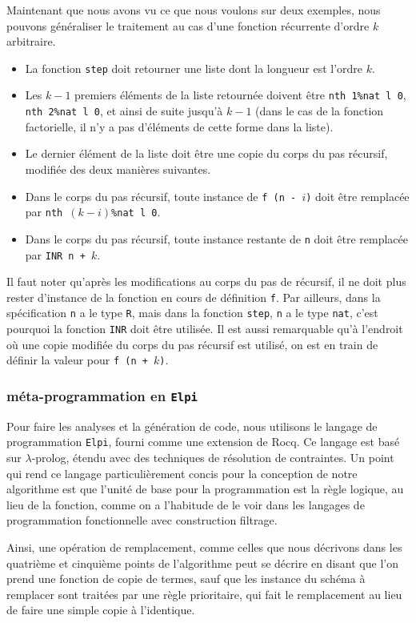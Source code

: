 \documentclass{modjflart}
\begin{document}
Maintenant que nous avons vu ce que nous voulons sur deux exemples,
nous pouvons généraliser le traitement au cas d'une fonction
récurrente d'ordre \(k\) arbitraire.
\begin{itemize}
\item La fonction \texttt{step} doit
retourner une liste dont la longueur est l'ordre \(k\).
\item Les \(k-1\) premiers éléments de la liste retournée doivent
  être \texttt{nth 1\%nat l 0}, \texttt{nth 2\%nat l 0}, et ainsi de suite
jusqu'à \(k - 1\)
  (dans le cas de la fonction factorielle, il n'y a pas d'éléments de
  cette forme dans la liste).
\item Le dernier élément de la liste doit être une copie du corps du
  pas récursif, modifiée des deux manières suivantes.
\item Dans le corps du pas récursif, toute instance de \texttt{f (n -
  \(i\))} doit être remplacée par \texttt{nth \((k - i)\)\%nat l 0}.
\item Dans le corps du pas récursif, toute instance restante de \texttt{n} doit
  être remplacée par \texttt{INR n + \(k\)}.
\end{itemize}
Il faut noter qu'après les modifications au corps du pas de récursif,
il ne doit plus rester d'instance de la fonction en cours de
définition \texttt{f}.  Par
ailleurs, dans la spécification \texttt{n} a le type \texttt{R}, mais dans
la fonction \texttt{step}, \texttt{n} a le type \texttt{nat}, c'est pourquoi la
fonction \texttt{INR} doit être utilisée.  Il est aussi remarquable qu'à
l'endroit où une copie modifiée du corps du pas récursif est utilisé,
on est en train de
définir la valeur pour \texttt{f (n + \(k\))}.

\subsubsection{méta-programmation en \texttt{Elpi}}
Pour faire les analyses et la génération de code,
nous utilisons le langage de programmation
\texttt{Elpi}, fourni comme une extension de Rocq.  Ce langage est basé
sur \(\lambda\)-prolog, étendu avec des techniques de résolution de
contraintes.  Un point qui rend ce langage particulièrement concis
pour la conception de notre algorithme est que l'unité de base pour la
programmation est la règle logique, au lieu de la fonction, comme on a
l'habitude de le voir dans les langages de programmation fonctionnelle
avec construction filtrage.

Ainsi, une opération de remplacement, comme celles que nous décrivons
dans les quatrième et cinquième points de l'algorithme peut se décrire
en disant que l'on prend une fonction de copie de termes, sauf que les
instance du schéma à remplacer sont traitées par une règle prioritaire,
qui fait le remplacement au lieu de faire une simple copie à
l'identique.
\end{document}
